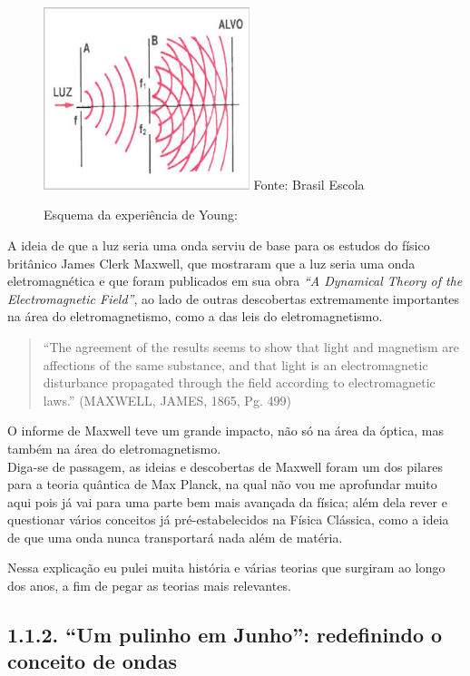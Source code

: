 \documentclass[
  a4paper]{article}
\begin{document}
\begin{figure}[!h]
\centering
    \caption{Esquema da experiência de Young:} 
    \includegraphics[width=60mm]{../_img/experiencia_de_young.jpg}
    \linebreak
    Fonte: Brasil Escola  
\end{figure}

A ideia de que a luz seria uma onda serviu de base para os estudos do
físico britânico James Clerk Maxwell, que mostraram que a luz seria uma
onda eletromagnética e que foram publicados em sua obra \emph{``A
Dynamical Theory of the Electromagnetic Field''}, ao lado de outras
descobertas extremamente importantes na área do eletromagnetismo, como a
das leis do eletromagnetismo.

\begin{quote}
``The agreement of the results seems to show that light and magnetism
are affections of the same substance, and that light is an
electromagnetic disturbance propagated through the field according to
electromagnetic laws.'' (MAXWELL, JAMES, 1865, Pg. 499)
\end{quote}

O informe de Maxwell teve um grande impacto, não só na área da óptica,
mas também na área do eletromagnetismo.\\
Diga-se de passagem, as ideias e descobertas de Maxwell foram um dos
pilares para a teoria quântica de Max Planck, na qual não vou me
aprofundar muito aqui pois já vai para uma parte bem mais avançada da
física; além dela rever e questionar vários conceitos já
pré-estabelecidos na Física Clássica, como a ideia de que uma onda nunca
transportará nada além de matéria.

Nessa explicação eu pulei muita história e várias teorias que surgiram
ao longo dos anos, a fim de pegar as teorias mais relevantes.

\hypertarget{um-pulinho-em-junho-redefinindo-o-conceito-de-ondas}{%
\subsection{1.1.2. ``Um pulinho em Junho'': redefinindo o conceito de
ondas}\label{um-pulinho-em-junho-redefinindo-o-conceito-de-ondas}}
\end{document}
